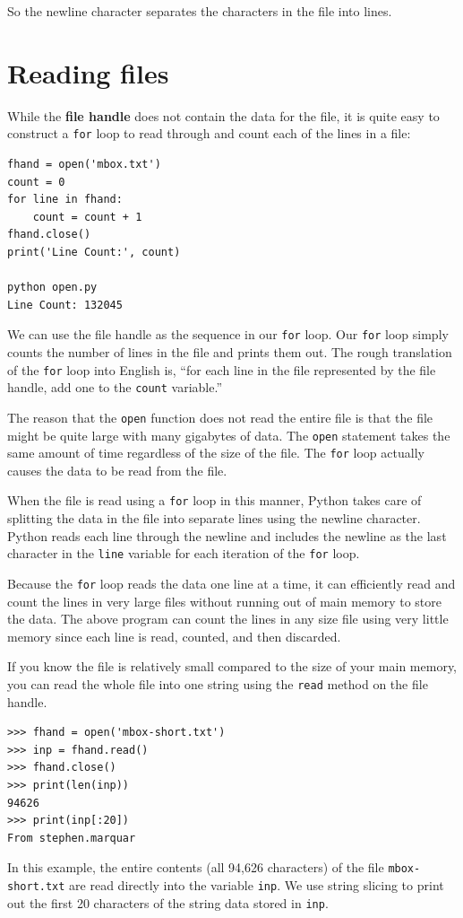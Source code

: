 So the newline character separates the characters 
in the file into lines.

\section{Reading files}

While the {\bf file handle} does not contain the data for the file,
it is quite easy to construct a {\tt for} loop to read through 
and count each of the lines in a file:

\beforeverb
\begin{verbatim}
fhand = open('mbox.txt')
count = 0
for line in fhand:
    count = count + 1
fhand.close()
print('Line Count:', count)

python open.py 
Line Count: 132045
\end{verbatim}
\afterverb
%
We can use the file handle as the sequence in our {\tt for} loop.  
Our {\tt for} loop simply counts the number of lines in the 
file and prints them out.  The rough translation of the {\tt for}
loop into English is, ``for each line in the file represented by the file
handle, add one to the {\tt count} variable.''

The reason that the {\tt open} function does not read the entire file
is that the file might be quite large with many gigabytes of data.
The {\tt open} statement takes the same amount of time regardless of the
size of the file.  The {\tt for} loop actually causes the data to be 
read from the file.

When the file is read using a {\tt for} loop in this manner, Python
takes care of splitting the data in the file into separate lines using
the newline character.  Python reads each line through 
the newline and includes
the newline as the last character in the {\tt line} variable for each 
iteration of the {\tt for} loop.

Because the {\tt for} loop reads the data one line at a time, it can efficiently
read and count the lines in very large files without running 
out of main memory to store the data.  The above program can 
count the lines in any size file using very little memory since 
each line is read, counted, and then discarded.

If you know the file is relatively small compared to the size of 
your main memory, you can read the whole file into one string
using the {\tt read} method on the file handle.

\beforeverb
\begin{verbatim}
>>> fhand = open('mbox-short.txt')
>>> inp = fhand.read()
>>> fhand.close()
>>> print(len(inp))
94626
>>> print(inp[:20])
From stephen.marquar
\end{verbatim}
\afterverb
%
In this example, the entire contents (all 94,626 characters) 
of the file {\tt mbox-short.txt} are read directly into the 
variable {\tt inp}.  We use string slicing to print out the first
20 characters of the string data stored in {\tt inp}.

